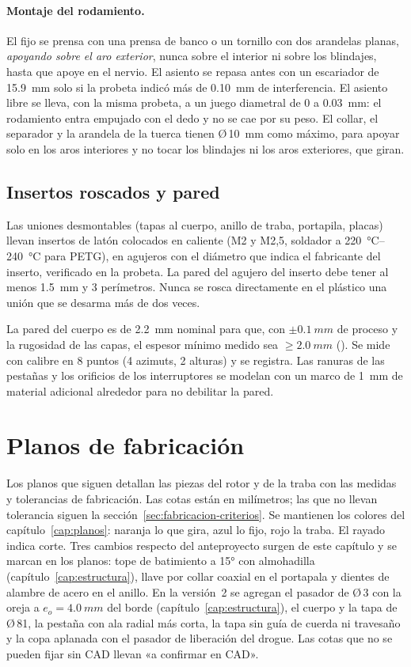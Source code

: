 \paragraph{Montaje del rodamiento.} El fijo se prensa con una prensa de banco o un
tornillo con dos arandelas planas, \emph{apoyando sobre el aro exterior}, nunca sobre el
interior ni sobre los blindajes, hasta que apoye en el nervio. El asiento se repasa antes
con un escariador de \SI{15.9}{mm} solo si la probeta indicó más de \SI{0.10}{mm} de
interferencia. El asiento libre se lleva, con la misma probeta, a un juego diametral de
0 a \SI{0.03}{mm}: el rodamiento entra empujado con el dedo y no se cae por su peso. El
collar, el separador y la arandela de la tuerca tienen Ø\,\SI{10}{mm} como máximo, para
apoyar solo en los aros interiores y no tocar los blindajes ni los aros exteriores, que
giran.

\subsection{Insertos roscados y pared}
Las uniones desmontables (tapas al cuerpo, anillo de traba, portapila, placas) llevan
insertos de latón colocados en caliente (M2 y M2,5, soldador a \SIrange{220}{240}{\celsius}
para PETG), en agujeros con el diámetro que indica el fabricante del inserto, verificado en
la probeta. La pared del agujero del inserto debe tener al menos \SI{1.5}{mm} y 3
perímetros. Nunca se rosca directamente en el plástico una unión que se desarma más de dos
veces.

La pared del cuerpo es de \SI{2.2}{mm} nominal para que, con $\pm\SI{0.1}{mm}$ de
proceso y la rugosidad de las capas, el espesor mínimo medido sea $\ge\SI{2.0}{mm}$
(). Se mide con calibre en 8 puntos (4 azimuts, 2 alturas) y se registra. Las
ranuras de las pestañas y los orificios de los interruptores se modelan con un marco de
\SI{1}{mm} de material adicional alrededor para no debilitar la pared.

\section{Planos de fabricación}\label{sec:fabricacion-planos}

Los planos que siguen detallan las piezas del rotor y de la traba con las medidas y
tolerancias de fabricación. Las cotas están en milímetros; las que no llevan tolerancia
siguen la sección~\ref{sec:fabricacion-criterios}. Se mantienen los colores del
capítulo~\ref{cap:planos}: naranja lo que gira, azul lo fijo, rojo la traba. El rayado
indica corte. Tres cambios respecto del anteproyecto surgen de este capítulo y se marcan
en los planos: tope de batimiento a \ang{+15} con almohadilla (capítulo~\ref{cap:estructura}),
llave por collar coaxial en el portapala y dientes de alambre de acero en el anillo. En la
versión~2 se agregan el pasador de Ø\,3 con la oreja a $e_o=\SI{4.0}{mm}$ del borde
(capítulo~\ref{cap:estructura}), el cuerpo y la tapa de Ø\,81, la pestaña con ala radial más corta,
la tapa sin guía de cuerda ni travesaño y la copa aplanada con el pasador de liberación del drogue. Las cotas que no se pueden fijar sin CAD llevan
«a confirmar en CAD».

